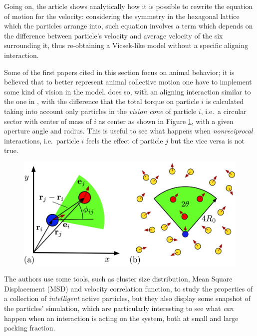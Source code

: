 \documentclass[../../master_thesis_np.tex]{subfiles}
\begin{document}
	Going on, the article shows analytically how it is possible to rewrite the equation of motion for the velocity: considering the symmetry in the hexagonal lattice which the particles arrange into, such equation involves a term which depends on the difference between particle's velocity and average velocity of the six surrounding it, thus re-obtaining a Vicsek-like model without a specific aligning interaction.
	
	Some of the first papers cited in this section focus on animal behavior; it is believed that to better represent animal collective motion one have to implement some kind of vision in the model. 
	\cite{negi_emergent_2022} does so, with an aligning interaction similar to the one in \cite{martin-gomez_collective_2018}, with the difference that the total torque on particle $i$ is calculated taking into account only particles in the \emph{vision cone} of particle $i$, i.e.\ a circular sector with center of mass of $i$ as center as shown in Figure \ref{fig:negi_vision1}, with a given aperture angle and radius. 
	This is useful to see what happens when \emph{nonreciprocal} interactions, i.e.\ particle $i$ feels the effect of particle $j$ but the vice versa is not true.
	
	\begin{figure}[htp]
		\centering
		\includegraphics[width=\singfigwidth]{negi_vision1.png}
		\caption{\cite{negi_emergent_2022}}
		\label{fig:negi_vision1}
	\end{figure}
	
	
	The authors use some tools, such as cluster size distribution, Mean Square Displacement (MSD) and velocity correlation function, to study the properties of a collection of \emph{intelligent} active particles, but they also display some snapshot of the particles' simulation, which are particularly interesting to see what \emph{can} happen when an interaction is acting on the system, both at small and large packing fraction. 
	
\end{document}
